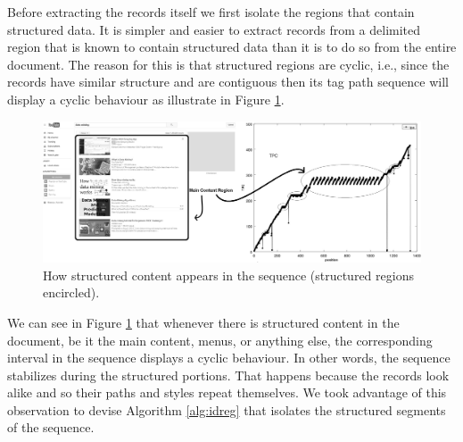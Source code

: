 \documentclass{vldb}
\begin{document}
Before extracting the records itself we first isolate the regions that contain
structured data. It is simpler and easier to extract records from a delimited
region that is known to contain structured data than it is to do so from the
entire document. The reason for this is that structured regions are cyclic,
i.e., since the records have similar structure and are contiguous then its tag
path sequence will display a cyclic behaviour as illustrate in Figure
\ref{fig:stru}.

\begin{figure}[h]
 \captionsetup{width=\textwidth}
  \centering
     \includegraphics[width=\textwidth]{img/main-reg.jpg}
  \caption{How structured content appears in the sequence (structured regions encircled).}
  \label{fig:stru}
\end{figure}

We can see in Figure \ref{fig:stru} that whenever there is structured content in
the document, be it the main content, menus, or anything else, the corresponding
interval in the sequence displays a cyclic behaviour. In other words, the
sequence stabilizes during the structured portions. That happens because the
records look alike and so their paths and styles repeat themselves. We took
advantage of this observation to devise Algorithm \ref{alg:idreg} that isolates
the structured segments of the sequence.
\end{document}
